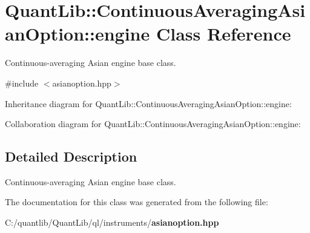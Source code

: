 \section{Quant\+Lib\+:\+:Continuous\+Averaging\+Asian\+Option\+:\+:engine Class Reference}
\label{class_quant_lib_1_1_continuous_averaging_asian_option_1_1engine}


Continuous-\/averaging Asian engine base class.  




{\ttfamily \#include $<$asianoption.\+hpp$>$}



Inheritance diagram for Quant\+Lib\+:\+:Continuous\+Averaging\+Asian\+Option\+:\+:engine\+:


Collaboration diagram for Quant\+Lib\+:\+:Continuous\+Averaging\+Asian\+Option\+:\+:engine\+:


\subsection{Detailed Description}
Continuous-\/averaging Asian engine base class. 

The documentation for this class was generated from the following file\+:\begin{DoxyCompactItemize}
\item 
C\+:/quantlib/\+Quant\+Lib/ql/instruments/{\bf asianoption.\+hpp}\end{DoxyCompactItemize}
